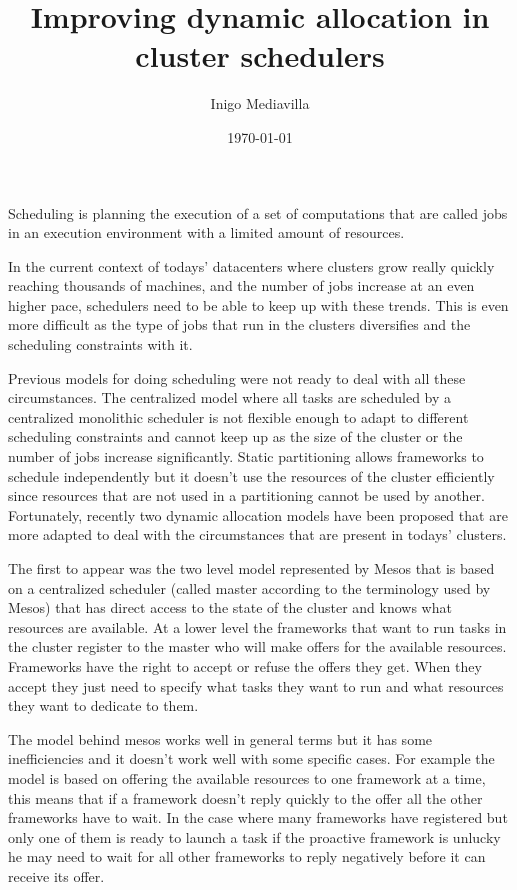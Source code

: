 \documentclass{svjour3}                     %
\begin{document}
\title{ Improving dynamic allocation in cluster schedulers }


\author{ Inigo Mediavilla }
\date{\today}
\maketitle

Scheduling is planning the execution of a set of computations that are
called jobs in an execution environment with a limited amount of
resources.

In the current context of todays' datacenters where clusters grow
really quickly reaching thousands of machines, and the number of jobs
increase at an even higher pace, schedulers need to be able to keep up with
these trends. This is even more difficult as the type of jobs that run
in the clusters diversifies and the scheduling constraints with it.

Previous models for doing scheduling were not ready to deal with all
these circumstances. The centralized model where all tasks are
scheduled by a centralized monolithic scheduler is not flexible enough
to adapt to different scheduling constraints and cannot keep up as the
size of the cluster or the number of jobs increase
significantly. Static partitioning allows frameworks to schedule
independently but it doesn't use the resources of the cluster
efficiently since resources that are not used in a partitioning cannot
be used by another. Fortunately, recently two dynamic allocation
models have been proposed that are more adapted to deal with the
circumstances that are present in todays' clusters.

The first to appear was the two level model represented by Mesos that
is based on a centralized scheduler (called master according to the
terminology used by Mesos) that has direct access to the state of the
cluster and knows what resources are available. At a lower level the
frameworks that want to run tasks in the cluster register to the
master who will make offers for the available resources. Frameworks
have the right to accept or refuse the offers they get. When they
accept they just need to specify what tasks they want to run and what
resources they want to dedicate to them.

The model behind mesos works well in general terms but it has some
inefficiencies and it doesn't work well with some specific cases. For
example the model is based on offering the available resources to one
framework at a time, this means that if a framework doesn't reply
quickly to the offer all the other frameworks have to wait. In the
case where many frameworks have registered but only one of them is
ready to launch a task if the proactive framework is unlucky he may
need to wait for all other frameworks to reply negatively before it
can receive its offer.
\end{document}

